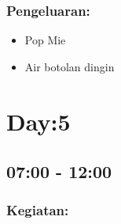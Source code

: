 \documentclass[12pt,]{article}
\begin{document}
	\subsubsection{Pengeluaran:}
	\begin{itemize}
		\item Pop Mie
		\item Air botolan dingin 
	\end{itemize}

	\newpage
	\section{Day:5}
	\subsection{07:00 - 12:00}
	\subsubsection{Kegiatan:}
\end{document}
